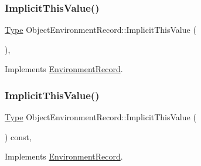 \subsubsection{\texorpdfstring{Implicit\+This\+Value()}{ImplicitThisValue()}\hspace{0.1cm}{\footnotesize\ttfamily [1/2]}}
{\footnotesize\ttfamily \hyperlink{class_type}{Type} Object\+Environment\+Record\+::\+Implicit\+This\+Value (\begin{DoxyParamCaption}{ }\end{DoxyParamCaption})\hspace{0.3cm}{\ttfamily [final]}, {\ttfamily [virtual]}}



Implements \hyperlink{struct_environment_record_acef5c0dac3d58cbef25daa495c5d0e00}{Environment\+Record}.

\mbox{\label{struct_object_environment_record_a4c620b161bb8939304bb688bfa2e5d3b}} 
\subsubsection{\texorpdfstring{Implicit\+This\+Value()}{ImplicitThisValue()}\hspace{0.1cm}{\footnotesize\ttfamily [2/2]}}
{\footnotesize\ttfamily \hyperlink{class_type}{Type} Object\+Environment\+Record\+::\+Implicit\+This\+Value (\begin{DoxyParamCaption}{ }\end{DoxyParamCaption}) const\hspace{0.3cm}{\ttfamily [final]}, {\ttfamily [virtual]}}



Implements \hyperlink{struct_environment_record_a9c60c0ab4900f6a8cdc50ceefdbf0507}{Environment\+Record}.

\mbox{\label{struct_object_environment_record_acbc8e93de3f48c41c0413957974642b0}} 
